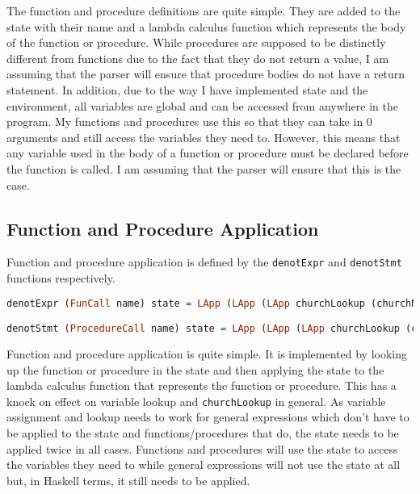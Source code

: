 The function and procedure definitions are quite simple. They are added to the
state with their name and a lambda calculus function which represents the body
of the function or procedure. While procedures are supposed to be distinctly
different from functions due to the fact that they do not return a value, I am
assuming that the parser will ensure that procedure bodies do not have a return
statement. In addition, due to the way I have implemented state and the
environment, all variables are global and can be accessed from anywhere in the
program. My functions and procedures use this so that they can take in 0
arguments and still access the variables they need to. However, this means that
any variable used in the body of a function or procedure must be declared
before the function is called. I am assuming that the parser will ensure that
this is the case.

\subsection{Function and Procedure Application}
\label{section:functionandprocedureapplication}

Function and procedure application is defined by the \texttt{denotExpr} and \texttt{denotStmt} functions respectively.

\begin{lstlisting}[language=Haskell]
denotExpr (FunCall name) state = LApp (LApp (LApp churchLookup (churchNum name)) state) state

denotStmt (ProcedureCall name) state = LApp (LApp (LApp churchLookup (churchNum name)) state) state
\end{lstlisting}

Function and procedure application is quite simple. It is implemented by
looking up the function or procedure in the state and then applying the state
to the lambda calculus function that represents the function or procedure. This
has a knock on effect on variable lookup and \texttt{churchLookup} in general. As
variable assignment and lookup needs to work for general expressions which
don't have to be applied to the state and functions/procedures that do, the
state needs to be applied twice in all cases. Functions and procedures will use
the state to access the variables they need to while general expressions will
not use the state at all but, in Haskell terms, it still needs to be
applied.
